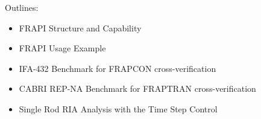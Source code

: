 \begin{frame}{Outlines:}
    \normalsize
    \center
    \begin{itemize}
        \item FRAPI Structure and Capability 
        \item FRAPI Usage Example
        \item IFA-432 Benchmark for FRAPCON cross-verification
        \item CABRI REP-NA Benchmark for FRAPTRAN cross-verification
        \item Single Rod RIA Analysis with the Time Step Control
    \end{itemize}
\end{frame}